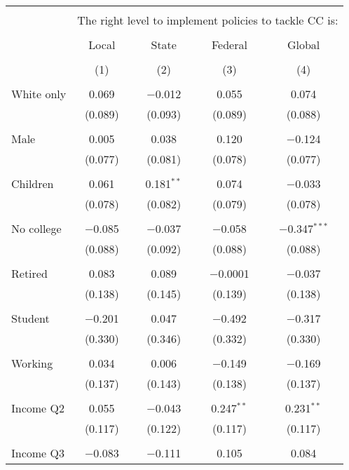 
\begin{tabular}{@{\extracolsep{5pt}}lcccc} 
\\[-1.8ex]\hline 
\hline \\[-1.8ex] 
 & \multicolumn{4}{c}{The right level to implement policies to tackle CC is:} \\ 
\cline{2-5} 
\\[-1.8ex] & Local & State & Federal & Global \\ 
\\[-1.8ex] & (1) & (2) & (3) & (4)\\ 
\hline \\[-1.8ex] 
 White only & 0.069 & $-$0.012 & 0.055 & 0.074 \\ 
  & (0.089) & (0.093) & (0.089) & (0.088) \\ 
  & & & & \\ 
 Male & 0.005 & 0.038 & 0.120 & $-$0.124 \\ 
  & (0.077) & (0.081) & (0.078) & (0.077) \\ 
  & & & & \\ 
 Children & 0.061 & 0.181$^{**}$ & 0.074 & $-$0.033 \\ 
  & (0.078) & (0.082) & (0.079) & (0.078) \\ 
  & & & & \\ 
 No college & $-$0.085 & $-$0.037 & $-$0.058 & $-$0.347$^{***}$ \\ 
  & (0.088) & (0.092) & (0.088) & (0.088) \\ 
  & & & & \\ 
 Retired & 0.083 & 0.089 & $-$0.0001 & $-$0.037 \\ 
  & (0.138) & (0.145) & (0.139) & (0.138) \\ 
  & & & & \\ 
 Student & $-$0.201 & 0.047 & $-$0.492 & $-$0.317 \\ 
  & (0.330) & (0.346) & (0.332) & (0.330) \\ 
  & & & & \\ 
 Working & 0.034 & 0.006 & $-$0.149 & $-$0.169 \\ 
  & (0.137) & (0.143) & (0.138) & (0.137) \\ 
  & & & & \\ 
 Income Q2 & 0.055 & $-$0.043 & 0.247$^{**}$ & 0.231$^{**}$ \\ 
  & (0.117) & (0.122) & (0.117) & (0.117) \\ 
  & & & & \\ 
 Income Q3 & $-$0.083 & $-$0.111 & 0.105 & 0.084 \\ 

\end{tabular}
